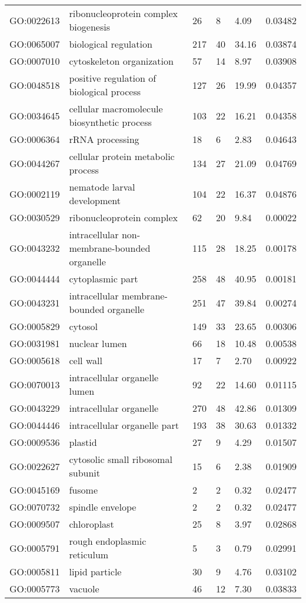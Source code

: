 \documentclass[10pt]{bmc_article}
\newenvironment{bmcformat}{\begin{raggedright}\baselineskip20pt\sloppy\setboolean{publ}{false}}{\end{raggedright}\baselineskip20pt\sloppy}
\begin{document}
\begin{bmcformat}
\begin{longtable}{lp{4.5cm}llll}
  GO:0022613 & ribonucleoprotein complex biogenesis &  26 &   8 & 4.09 & 0.03482 \\ 
  GO:0065007 & biological regulation & 217 &  40 & 34.16 & 0.03874 \\ 
  GO:0007010 & cytoskeleton organization &  57 &  14 & 8.97 & 0.03908 \\ 
  GO:0048518 & positive regulation of biological process & 127 &  26 & 19.99 & 0.04357 \\ 
  GO:0034645 & cellular macromolecule biosynthetic process & 103 &  22 & 16.21 & 0.04358 \\ 
  GO:0006364 & rRNA processing &  18 &   6 & 2.83 & 0.04643 \\ 
  GO:0044267 & cellular protein metabolic process & 134 &  27 & 21.09 & 0.04769 \\ 
  GO:0002119 & nematode larval development & 104 &  22 & 16.37 & 0.04876 \\ 
   \hline
GO:0030529 & ribonucleoprotein complex &  62 &  20 & 9.84 & 0.00022 \\ 
  GO:0043232 & intracellular non-membrane-bounded organelle & 115 &  28 & 18.25 & 0.00178 \\ 
  GO:0044444 & cytoplasmic part & 258 &  48 & 40.95 & 0.00181 \\ 
  GO:0043231 & intracellular membrane-bounded organelle & 251 &  47 & 39.84 & 0.00274 \\ 
  GO:0005829 & cytosol & 149 &  33 & 23.65 & 0.00306 \\ 
  GO:0031981 & nuclear lumen &  66 &  18 & 10.48 & 0.00538 \\ 
  GO:0005618 & cell wall &  17 &   7 & 2.70 & 0.00922 \\ 
  GO:0070013 & intracellular organelle lumen &  92 &  22 & 14.60 & 0.01115 \\ 
  GO:0043229 & intracellular organelle & 270 &  48 & 42.86 & 0.01309 \\ 
  GO:0044446 & intracellular organelle part & 193 &  38 & 30.63 & 0.01332 \\ 
  GO:0009536 & plastid &  27 &   9 & 4.29 & 0.01507 \\ 
  GO:0022627 & cytosolic small ribosomal subunit &  15 &   6 & 2.38 & 0.01909 \\ 
  GO:0045169 & fusome &   2 &   2 & 0.32 & 0.02477 \\ 
  GO:0070732 & spindle envelope &   2 &   2 & 0.32 & 0.02477 \\ 
  GO:0009507 & chloroplast &  25 &   8 & 3.97 & 0.02868 \\ 
  GO:0005791 & rough endoplasmic reticulum &   5 &   3 & 0.79 & 0.02991 \\ 
  GO:0005811 & lipid particle &  30 &   9 & 4.76 & 0.03102 \\ 
  GO:0005773 & vacuole &  46 &  12 & 7.30 & 0.03833 \\ 
   \hline
\hline
\end{longtable}
\newpage


\end{bmcformat}
\end{document}
